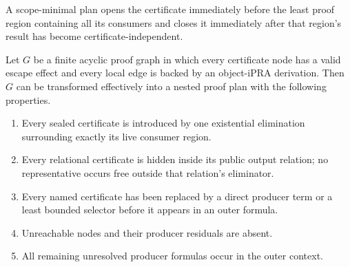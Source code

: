 A scope-minimal plan opens the certificate immediately before the least proof
region containing all its consumers and closes it immediately after that
region's result has become certificate-independent.

\begin{theorem}
\label{thm:scope-normal-form}
Let \(G\) be a finite acyclic proof graph in which every certificate node has a
valid escape effect and every local edge is backed by an object-iPRA derivation.
Then \(G\) can be transformed effectively into a nested proof plan with the
following properties.

\begin{enumerate}[label=(\roman*)]
\item Every sealed certificate is introduced by one existential elimination
  surrounding exactly its live consumer region.
\item Every relational certificate is hidden inside its public output relation;
  no representative occurs free outside that relation's eliminator.
\item Every named certificate has been replaced by a direct producer term or a
  least bounded selector before it appears in an outer formula.
\item Unreachable nodes and their producer residuals are absent.
\item All remaining unresolved producer formulas occur in the outer context.
\end{enumerate}
\end{theorem}

